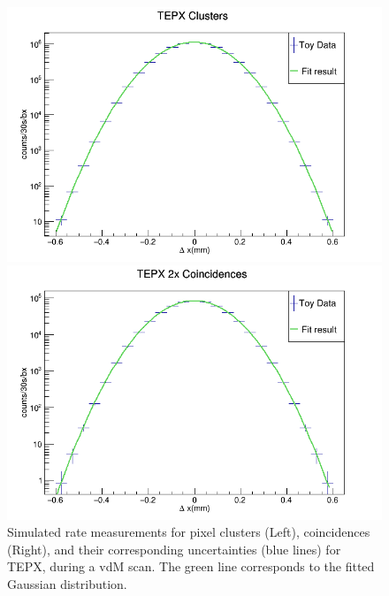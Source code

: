 \begin{center}
    \begin{figure}[H]
\begin{minipage}[b]{0.5\linewidth}
        \centering
        \includegraphics[scale=0.3]{Chapter4/plots/toy_cTEPX.png}
\end{minipage}
\begin{minipage}[b]{0.5\linewidth}
        \centering
        \includegraphics[scale=0.3]{Chapter4/plots/toy_2xTEPX.png}
\end{minipage}
    \caption[Simulated rate measurements of the vdM toy study for TEPX.]{Simulated rate measurements for pixel clusters (Left), coincidences (Right), and their corresponding uncertainties (blue lines) for TEPX, during a vdM scan. The green line corresponds to the fitted Gaussian distribution.}
    \label{ref1}
\end{figure}
\end{center}
